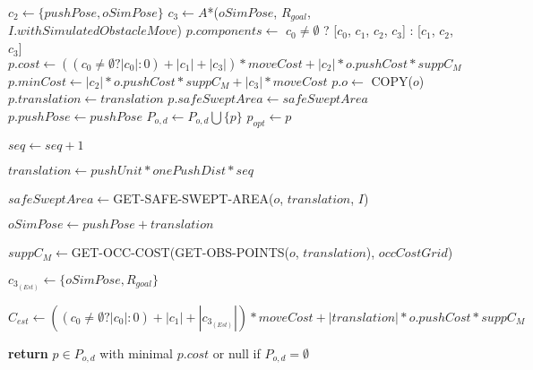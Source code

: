 \begin{algorithm}[H]

  \label{alg:07-custom-merge-optimized-planforobstacle-part2}

  \begin{algorithmic}[1]



            \State $c_{2} \gets \{pushPose, oSimPose\}$
            \State $c_{3} \gets A$*($oSimPose$, $R_{goal}$, $I.withSimulatedObstacleMove$)
              \State $p.components \gets$ $c_{0} \neq \emptyset$ ? [$c_{0}$, $c_{1}$, $c_{2}$, $c_{3}$] : [$c_{1}$, $c_{2}$, $c_{3}$]
              \State $p.cost \gets ((c_{0} \neq \emptyset ? |c_{0}| : 0) + |c_{1}| + |c_{3}|) * moveCost + |c_{2}| * o.pushCost * suppC_{M}$
              \State $p.minCost \gets |c_{2}| * o.pushCost * suppC_{M} + |c_{3}| * moveCost$
              \State $p.o \gets$ COPY($o$)
              \State $p.translation \gets translation$
              \State $p.safeSweptArea \gets safeSweptArea$
              \State $p.pushPose \gets pushPose$
              \State $P_{o,d} \gets P_{o,d} \bigcup \{p\}$
                \State $p_{opt} \gets p$
              \EndIf
            \EndIf

          \State $seq \gets seq + 1$

          \State $translation \gets pushUnit * onePushDist * seq$

          \State $safeSweptArea \gets $GET-SAFE-SWEPT-AREA($o$, $translation$, $I$)

          \State $oSimPose \gets pushPose + translation$

          \State $suppC_{M} \gets $GET-OCC-COST(GET-OBS-POINTS($o$, $translation$), $occCostGrid$)

          \State $c_{3_{(Est)}} \gets \{oSimPose, R_{goal}\}$

          \State $C_{est} \gets ((c_{0} \neq \emptyset ? |c_{0}| : 0) + |c_{1}| + |c_{3_{(Est)}}|) * moveCost + |translation| * o.pushCost * suppC_{M}$

        \EndWhile

      \EndFor

    \State \textbf{return} $p \in P_{o,d}$ with minimal $p.cost$ or null if $P_{o,d} = \emptyset$

    \EndProcedure

  \end{algorithmic}
\end{algorithm}
